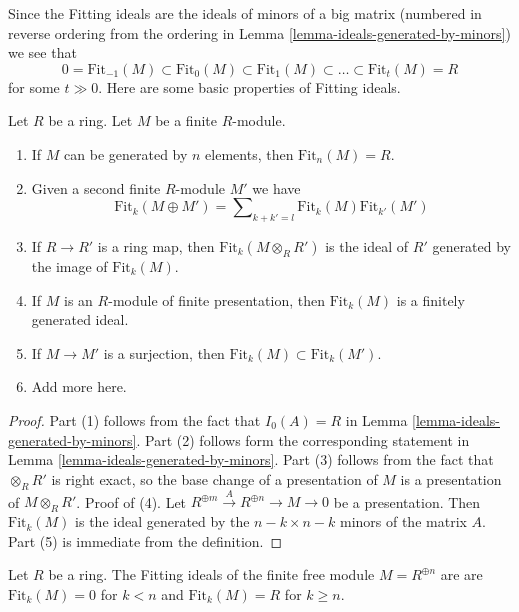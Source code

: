 \noindent
Since the Fitting ideals are the ideals of minors of a big matrix
(numbered in reverse ordering from the ordering in
Lemma \ref{lemma-ideals-generated-by-minors})
we see that
$$
0 = \text{Fit}_{-1}(M) \subset \text{Fit}_0(M) \subset \text{Fit}_1(M)
\subset \ldots \subset \text{Fit}_t(M) = R
$$
for some $t \gg 0$. Here are some basic properties of Fitting ideals.

\begin{lemma}
\label{lemma-fitting-ideal-basics}
Let $R$ be a ring. Let $M$ be a finite $R$-module.
\begin{enumerate}
\item If $M$ can be generated by $n$ elements, then
$\text{Fit}_n(M) = R$.
\item Given a second finite $R$-module $M'$ we have
$$
\text{Fit}_k(M \oplus M') =
\sum\nolimits_{k + k' = l} \text{Fit}_k(M)\text{Fit}_{k'}(M')
$$
\item If $R \to R'$ is a ring map, then $\text{Fit}_k(M \otimes_R R')$
is the ideal of $R'$ generated by the image of $\text{Fit}_k(M)$.
\item If $M$ is an $R$-module of finite presentation, then $\text{Fit}_k(M)$
is a finitely generated ideal.
\item If $M \to M'$ is a surjection, then
$\text{Fit}_k(M) \subset \text{Fit}_k(M')$.
\item Add more here.
\end{enumerate}
\end{lemma}

\begin{proof}
Part (1) follows from the fact that $I_0(A) = R$ in
Lemma \ref{lemma-ideals-generated-by-minors}.
Part (2) follows form the corresponding statement in
Lemma \ref{lemma-ideals-generated-by-minors}.
Part (3) follows from the fact that $\otimes_R R'$ is right exact,
so the base change of a presentation of $M$ is a presentation of
$M \otimes_R R'$.
Proof of (4). Let $R^{\oplus m} \xrightarrow{A} R^{\oplus n} \to M \to 0$
be a presentation. Then $\text{Fit}_k(M)$ is the ideal generated by the
$n - k \times n - k$ minors of the matrix $A$.
Part (5) is immediate from the definition.
\end{proof}

\begin{example}
\label{example-fitting-free}
Let $R$ be a ring.
The Fitting ideals of the finite free module $M = R^{\oplus n}$ are
are $\text{Fit}_k(M) = 0$ for $k < n$ and $\text{Fit}_k(M) = R$
for $k \geq n$.
\end{example}

